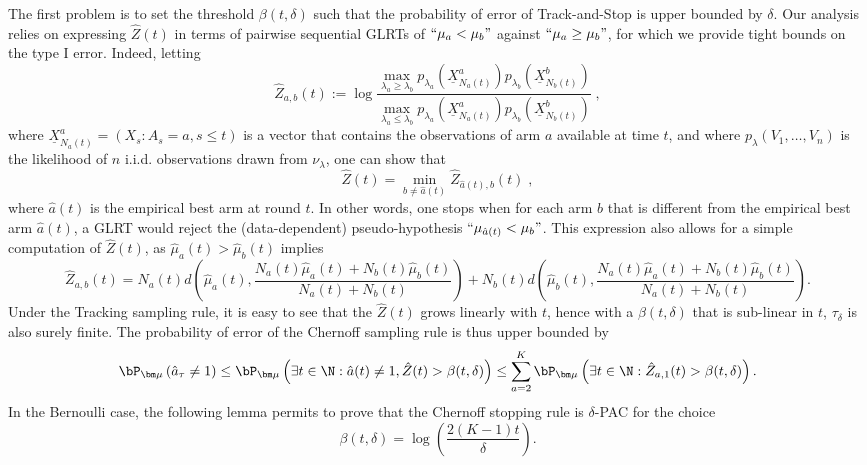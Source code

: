 \documentclass[proc]{edpsmath}
\begin{document}
	The first problem is to set the threshold $\beta(t,\delta)$ such that the probability of error of Track-and-Stop is upper bounded by $\delta$. Our analysis relies on expressing $\hat{Z}(t)$ in terms of pairwise sequential GLRTs of $``\mu_a < \mu_b"$ against $``\mu_a \geq \mu_b"$, for which we provide tight bounds on the type I error. Indeed, letting 
	\[\hat{Z}_{a,b}(t) := \log\frac{\max_{\lambda_a\geq \lambda_b} p_{\lambda_a}\left(\underline{X}^a_{N_a(t)}\right)p_{\lambda_b}\left(\underline{X}^b_{N_b(t)}\right)}{\max_{\lambda_a\leq \lambda_b} p_{\lambda_a}\left(\underline{X}^a_{N_a(t)}\right)p_{\lambda_b}\left(\underline{X}^b_{N_b(t)}\right)}\;,\]
	where $\underline{X}^a_{N_a(t)} = (X_s: A_s=a, s\leq t)$ is a vector that contains the observations of arm $a$ available at time $t$, and where $p_{\lambda}(V_1,\dots,V_n)$ is the likelihood of $n$ i.i.d. observations drawn from $\nu_{\lambda}$, one can show that  
	\begin{equation}\hat{Z}(t) = \min_{b \neq \hat{a}(t)} \hat{Z}_{\hat{a}(t),b}(t)\;,\label{def:ChernoffStopAlt}\end{equation}
	where $\hat{a}(t)$ is the empirical best arm at round $t$. In other words, one stops when for each arm $b$ that is different from the empirical best arm $\hat{a}(t)$, a GLRT would reject the (data-dependent) pseudo-hypothesis $``\mu_{\hat{a}(t)} < \mu_b"$. This expression also allows for a simple computation of $\hat{Z}(t)$, as  $\hat{\mu}_a(t) > \hat{\mu}_b(t)$ implies
	\[\hat{Z}_{a,b}(t) = N_a(t) d\left(\hat{\mu}_a(t),\frac{N_a(t)\hat{\mu}_a(t) + N_b(t)\hat{\mu}_b(t)}{N_a(t)+N_b(t)}\right) 
	+ N_b(t) d\left(\hat{\mu}_b(t),\frac{N_a(t)\hat{\mu}_a(t) + N_b(t)\hat{\mu}_b(t)}{N_a(t)+N_b(t)}\right).\]
	Under the Tracking sampling rule, it is easy to see that the $\hat{Z}(t)$ grows linearly with $t$, hence with a $\beta(t,\delta)$ that is sub-linear in $t$, $\tau_\delta$ is also surely finite. The probability of error of the Chernoff sampling rule is thus upper bounded by 
	\[\bP_{\bm \mu}\left(\hat{a}_\tau \neq 1\right) \leq \bP_{\bm \mu}\left(\exists t \in \N : \hat{a}(t) \neq 1 , \hat{Z}(t) > \beta(t,\delta)\right)\leq \sum_{a=2}^K\bP_{\bm \mu}\left(\exists t \in \N : \hat{Z}_{a,1}(t) > \beta(t,\delta)\right).\]
	In the Bernoulli case, the following lemma permits to prove that the Chernoff stopping rule is $\delta$-PAC for the choice \begin{equation}\beta(t,\delta) = \log\left(\frac{2(K-1)t}{\delta}\right).\label{ChoiceBeta}\end{equation}
	
\end{document}

